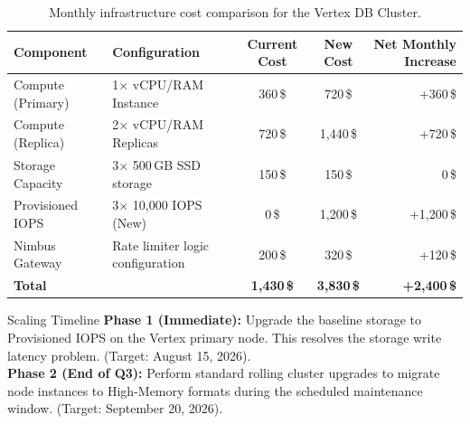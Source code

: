 \begin{table}[htbp]
  \centering
  \caption{Monthly infrastructure cost comparison for the Vertex DB Cluster.}
  \label{tab:cost_impact}
  \begin{tabularx}{\textwidth}{l X c c r}
    \toprule
    \textbf{Component} & \textbf{Configuration} & \textbf{Current Cost} & \textbf{New Cost} & \textbf{Net Monthly Increase} \\
    \midrule
    Compute (Primary) & 1$\times$ vCPU/RAM Instance & 360\,\$ & 720\,\$ & +360\,\$ \\
    \rowcolor{lightgray} Compute (Replica) & 2$\times$ vCPU/RAM Replicas & 720\,\$ & 1,440\,\$ & +720\,\$ \\
    Storage Capacity & 3$\times$ 500\,GB SSD storage & 150\,\$ & 150\,\$ & 0\,\$ \\
    \rowcolor{lightgray} Provisioned IOPS & 3$\times$ 10,000 IOPS (New) & 0\,\$ & 1,200\,\$ & +1,200\,\$ \\
    Nimbus Gateway & Rate limiter logic configuration & 200\,\$ & 320\,\$ & +120\,\$ \\
    \midrule
    \textbf{Total} & & \textbf{1,430\,\$} & \textbf{3,830\,\$} & \textbf{+2,400\,\$} \\
    \bottomrule
  \end{tabularx}
\end{table}

\begin{recommendationbox}{Scaling Timeline}
  \textbf{Phase 1 (Immediate):} Upgrade the baseline storage to Provisioned IOPS on the Vertex primary node. This resolves the storage write latency problem. (Target: August 15, 2026). \\{}
  \textbf{Phase 2 (End of Q3):} Perform standard rolling cluster upgrades to migrate node instances to High-Memory formats during the scheduled maintenance window. (Target: September 20, 2026).
\end{recommendationbox}

